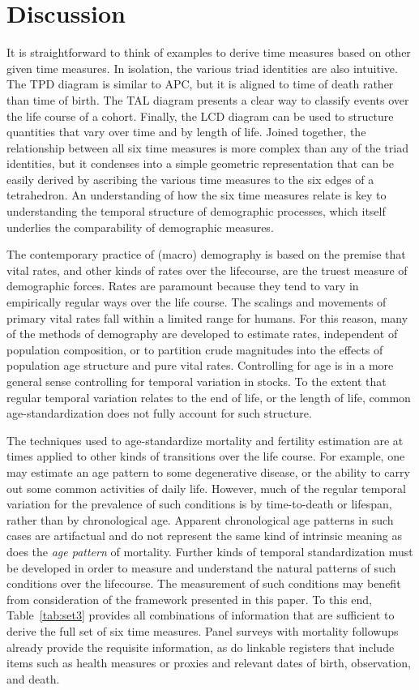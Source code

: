 \documentclass[12pt,oneside,a4paper]{article} %
\begin{document}
\section{Discussion}

It is straightforward to
think of examples to derive time measures based on other given
time measures. In isolation, the various triad identities are also intuitive.
The TPD diagram is similar to APC, but it is aligned to time of death rather
than time of birth. The TAL diagram presents a clear way to classify events
over the life course of a cohort. Finally, the LCD diagram can be used to
structure quantities that vary over time and by length of life.
Joined together, the relationship between all six time measures is more
complex than any of the triad identities, but it condenses into a simple
geometric representation that can be easily derived by ascribing the various time measures to the six edges of a tetrahedron. An understanding of how the six time measures relate is
key to understanding the temporal structure of demographic processes, which
itself underlies the comparability of demographic measures.

The contemporary practice of (macro) demography is based on the premise that
vital rates, and other kinds of rates over the lifecourse, are the truest measure of
demographic forces. Rates are paramount because they tend to vary in
empirically regular ways over the life course. The scalings and movements of
primary vital rates fall within a limited range for humans. For this reason, many of the methods of
demography are developed to estimate rates, independent of population composition, or to
partition crude magnitudes into the effects of population age structure and
pure vital rates. Controlling for age is in a more general sense controlling for
temporal variation in stocks. To the extent that regular temporal variation
relates to the end of life, or the length of life, common
age-standardization does not fully account for such structure.

The techniques used to age-standardize mortality and fertility estimation are at
times applied to other kinds of transitions over the life course. For example,
one may estimate an age pattern to some degenerative disease, or the
ability to carry out some common activities of daily life. However, much of the
regular temporal variation for the prevalence of such conditions is by
time-to-death or lifespan, rather than by chronological age. Apparent chronological age patterns
in such cases are artifactual and do not represent the same kind of
intrinsic meaning as does the \textit{age pattern} of mortality. Further kinds
of temporal standardization must be developed in order to measure and understand
the natural patterns of such conditions over the lifecourse. 
The measurement of
such conditions may benefit from consideration of the framework presented in
this paper. To this end, Table~\ref{tab:set3} provides all combinations of
information that are sufficient to derive the full set of six time measures.
Panel surveys with mortality followups already provide the requisite
information, as do linkable registers that include items such as
health measures or proxies and relevant dates of birth, observation, and death.
\end{document}
